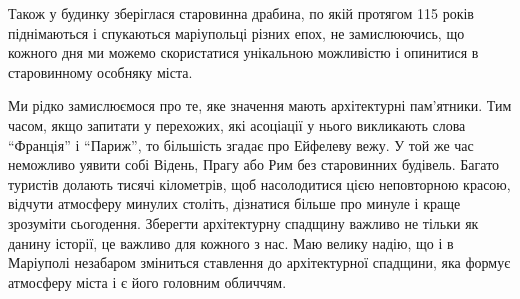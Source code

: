 
Також у будинку зберіглася старовинна драбина, по якій протягом 115 років
піднімаються і спукаються маріупольці різних епох, не замислюючись, що кожного
дня ми можемо скористатися унікальною можливістю і опинитися в старовинному
особняку міста.

Ми рідко замислюємося про те, яке значення мають архітектурні пам'ятники. Тим
часом, якщо запитати у перехожих, які асоціації у нього викликають слова
\enquote{Франція} і \enquote{Париж}, то більшість згадає про Ейфелеву вежу. У той же час
неможливо уявити собі Відень, Прагу або Рим без старовинних будівель. Багато
туристів долають тисячі кілометрів, щоб насолодитися цією неповторною красою,
відчути атмосферу минулих століть, дізнатися більше про минуле і краще
зрозуміти сьогодення. Зберегти архітектурну спадщину важливо не тільки як
данину історії, це важливо для кожного з нас. Маю велику надію, що і в
Маріуполі незабаром зміниться ставлення до архітектурної спадщини, яка формує
атмосферу міста і є його головним обличчям.

